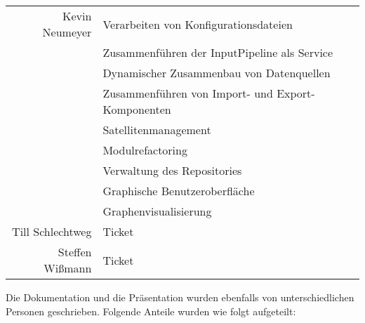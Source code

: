 \begin{table}[H]
\begin{tabular}{rl}
		Kevin Neumeyer & Verarbeiten von Konfigurationsdateien \\
		 & Zusammenführen der InputPipeline als Service \\
		 & Dynamischer Zusammenbau von Datenquellen \\
		 & Zusammenführen von Import- und Export-Komponenten \\
		 & Satellitenmanagement \\
		 & Modulrefactoring \\
		 & Verwaltung des Repositories \\
		 & Graphische Benutzeroberfläche \\
		 & Graphenvisualisierung \\
		Till Schlechtweg & Ticket \\
		Steffen Wißmann & Ticket \\
		\bottomrule
	\end{tabular}
\end{table}

Die Dokumentation und die Präsentation wurden ebenfalls von unterschiedlichen Personen geschrieben. Folgende Anteile wurden wie folgt aufgeteilt:

